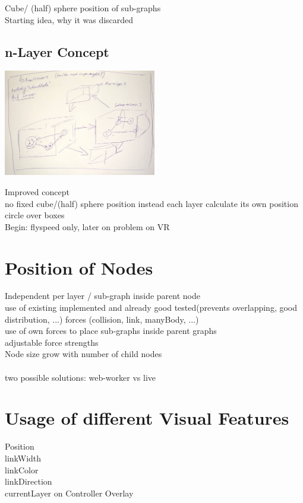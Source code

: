 Cube/ (half) sphere position of sub-graphs \\
Starting idea, why it was discarded

\subsection{n-Layer Concept}
\includegraphics[width=0.5\textwidth]{chapters/graphics/concept1.jpg}

Improved concept \\
no fixed cube/(half) sphere position instead each layer calculate its own position \\
circle over boxes \\
Begin: flyspeed only, later on problem on VR \\

\section{Position of Nodes}

Independent per layer / sub-graph inside parent node \\
use of existing implemented and already good tested(prevents overlapping, good distribution, ...) forces (collision, link, manyBody, ...) \\
use of own forces to place sub-graphs inside parent graphs \\
adjustable force strengths \\
Node size grow with number of child nodes \\
\\
two possible solutions: web-worker vs live \\

\section{Usage of different Visual Features}

Position \\
linkWidth \\
linkColor \\
linkDirection \\ 
currentLayer on Controller Overlay \\ 

